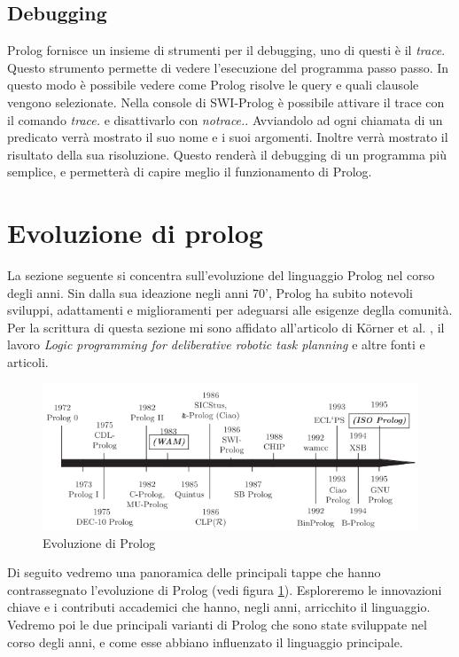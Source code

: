 \subsection{Debugging}
\label{subsec:debugging}
Prolog fornisce un insieme di strumenti per il debugging, uno di questi è il \textit{trace}. Questo strumento permette di vedere l'esecuzione del programma passo passo. 
In questo modo è possibile vedere come Prolog risolve le query e quali clausole vengono selezionate. Nella console di SWI-Prolog è possibile attivare il trace con il comando \textit{trace.} e disattivarlo con \textit{notrace.}.
Avviandolo ad ogni chiamata di un predicato verrà mostrato il suo nome e i suoi argomenti. Inoltre verrà mostrato il risultato della sua risoluzione. Questo renderà il debugging di un programma più semplice, e permetterà di capire meglio il funzionamento di Prolog.

\section{Evoluzione di prolog}
\label{sec:evoluzione}
La sezione seguente si concentra sull'evoluzione del linguaggio Prolog nel corso degli anni. Sin dalla sua ideazione negli anni 70', Prolog ha subito notevoli sviluppi, adattamenti e miglioramenti per adeguarsi
alle esigenze deglla comunità. Per la scrittura di questa sezione mi sono affidato all'articolo di K\"orner et al. \cite{korner2022fifty}, il lavoro \textit{Logic programming for deliberative robotic task planning} \cite{meli2023logic} e altre fonti e articoli.
\begin{figure}[h!]
    \centering
    \includegraphics[scale=0.5]{images/prologhist.png}
    \caption{Evoluzione di Prolog \cite{korner2022fifty}}
    \label{fig:prologhist}
\end{figure}

Di seguito vedremo una panoramica delle principali tappe che hanno contrassegnato l'evoluzione di Prolog (vedi figura \ref{fig:prologhist}). Esploreremo le innovazioni chiave e i contributi accademici
che hanno, negli anni, arricchito il linguaggio. Vedremo poi le due principali varianti di Prolog che sono state sviluppate nel corso degli anni, e come esse abbiano influenzato il linguaggio principale.


